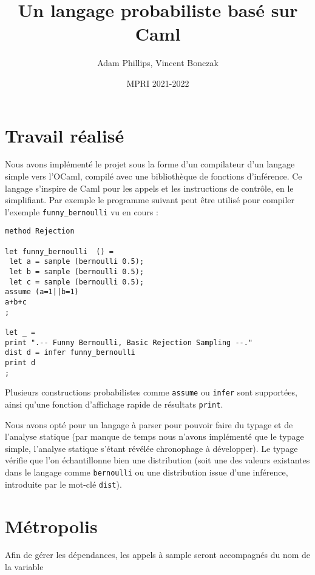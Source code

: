 \documentclass[svgnames]{article}
\begin{document}
\title{Un langage probabiliste basé sur Caml}

\author{Adam Phillips, Vincent Bonczak}

\date{MPRI 2021-2022}

\maketitle

\section{Travail réalisé}

Nous avons implémenté le projet sous la forme d'un compilateur d'un langage simple vers l'OCaml, compilé avec une bibliothèque de fonctions d'inférence.
Ce langage s'inspire de Caml pour les appels et les instructions de contrôle, en le simplifiant. Par exemple le programme suivant peut être utilisé pour compiler l'exemple \verb|funny_bernoulli| vu en cours :
\begin{lstlisting}
method Rejection

let funny_bernoulli  () =  
 let a = sample (bernoulli 0.5);
 let b = sample (bernoulli 0.5);  
 let c = sample (bernoulli 0.5); 
assume (a=1||b=1)
a+b+c
;

let _ = 
print ".-- Funny Bernoulli, Basic Rejection Sampling --."
dist d = infer funny_bernoulli  
print d
;

\end{lstlisting}

\bigskip

Plusieurs constructions probabilistes comme \verb|assume| ou \verb|infer| sont supportées, ainsi qu'une fonction d'affichage rapide de résultats \verb|print|.

Nous avons opté pour un langage à parser pour pouvoir faire du typage et de l'analyse statique (par manque de temps nous n'avons implémenté que le typage simple,
l'analyse statique s'étant révélée chronophage à développer).
Le typage vérifie que l'on échantillonne bien une distribution (soit une des valeurs existantes dans le langage comme \verb|bernoulli| ou une distribution issue d'une inférence, introduite par le mot-clé \lstinline{dist}).

\section{Métropolis}

Afin de gérer les dépendances, les appels à sample seront accompagnés du nom de la variable 
\end{document}
